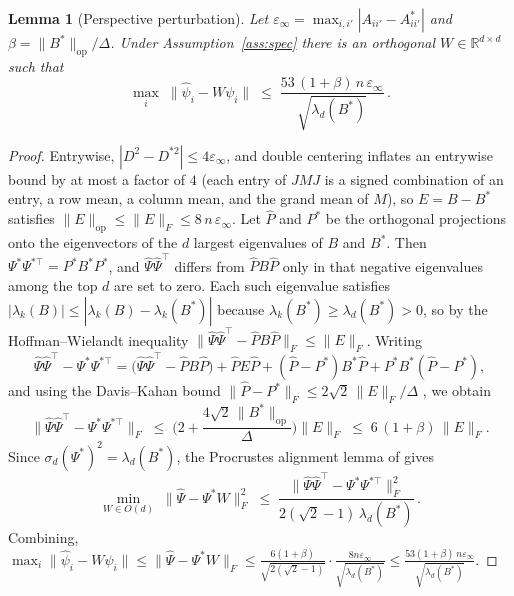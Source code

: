 \documentclass{article}
\newtheorem{lemma}{Lemma}
\theoremstyle{definition}
\theoremstyle{plain}
\begin{document}
\begin{lemma}[Perspective perturbation]
\label{lem:pert}
Let $\varepsilon_\infty=\max_{i,i'}|A_{ii'}-A^*_{ii'}|$ and
$\beta=\|B^*\|_{\mathrm{op}}/\Delta$. Under Assumption~\ref{ass:spec} there is an
orthogonal $W\in\mathbb{R}^{d\times d}$ such that
\[
\max_i\;\|\hat\psi_i-W\psi_i\|\;\le\;
\frac{53\,(1+\beta)\,n\,\varepsilon_\infty}{\sqrt{\lambda_d(B^*)}}\,.
\]
\end{lemma}
\begin{proof}
Entrywise, $|D^2-D^{*2}|\le4\varepsilon_\infty$, and double centering inflates an
entrywise bound by at most a factor of $4$ (each entry of $JMJ$ is a signed combination
of an entry, a row mean, a column mean, and the grand mean of $M$), so $E=B-B^*$
satisfies $\|E\|_{\mathrm{op}}\le\|E\|_F\le8\,n\,\varepsilon_\infty$. Let $\hat P$ and
$P^*$ be the orthogonal projections onto the eigenvectors of the $d$ largest
eigenvalues of $B$ and $B^*$. Then $\Psi^*\Psi^{*\top}=P^*B^*P^*$, and
$\hat\Psi\hat\Psi^\top$ differs from $\hat PB\hat P$ only in that negative eigenvalues
among the top $d$ are set to zero. Each such eigenvalue satisfies
$|\lambda_k(B)|\le|\lambda_k(B)-\lambda_k(B^*)|$ because $\lambda_k(B^*)\ge\lambda_d(B^*)>0$,
so by the Hoffman--Wielandt inequality 
$\|\hat\Psi\hat\Psi^\top-\hat PB\hat P\|_F\le\|E\|_F$. Writing
\[
\hat\Psi\hat\Psi^\top-\Psi^*\Psi^{*\top}
=\big(\hat\Psi\hat\Psi^\top-\hat PB\hat P\big)+\hat PE\hat P
+(\hat P-P^*)B^*\hat P+P^*B^*(\hat P-P^*),
\]
and using the Davis--Kahan bound
$\|\hat P-P^*\|_F\le2\sqrt2\,\|E\|_F/\Delta$ \citep[Theorem~2]{yu2015useful}, we obtain
\[
\|\hat\Psi\hat\Psi^\top-\Psi^*\Psi^{*\top}\|_F
\;\le\;\Big(2+\frac{4\sqrt2\,\|B^*\|_{\mathrm{op}}}{\Delta}\Big)\|E\|_F
\;\le\;6\,(1+\beta)\,\|E\|_F .
\]
Since $\sigma_d(\Psi^*)^2=\lambda_d(B^*)$, the Procrustes alignment lemma of
 gives
\[
\min_{W\in O(d)}\;\|\hat\Psi-\Psi^*W\|_F^2
\;\le\;\frac{\|\hat\Psi\hat\Psi^\top-\Psi^*\Psi^{*\top}\|_F^2}{2(\sqrt2-1)\,\lambda_d(B^*)}\,.
\]
Combining, $\max_i\|\hat\psi_i-W\psi_i\|\le\|\hat\Psi-\Psi^*W\|_F\le
\frac{6(1+\beta)}{\sqrt{2(\sqrt2-1)}}\cdot\frac{8n\varepsilon_\infty}{\sqrt{\lambda_d(B^*)}}
\le\frac{53(1+\beta)\,n\varepsilon_\infty}{\sqrt{\lambda_d(B^*)}}$.
\end{proof}
\end{document}
